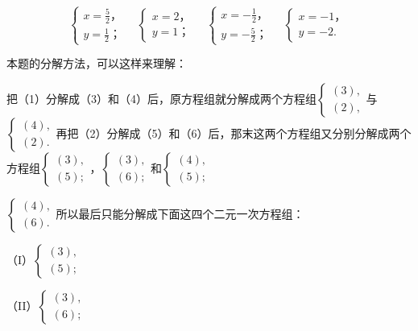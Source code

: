 \[
\left\{ \begin{array}{l} x = \frac{5}{2}\text{，} \\ y = \frac{1}{2}\text{；} \end{array} \right. \quad \left\{ \begin{array}{l} x = 2\text{，} \\ y = 1\text{；} \end{array} \right. \quad \left\{ \begin{array}{l} x = - \frac{1}{2}\text{，} \\ y = - \frac{5}{2}\text{；} \end{array} \right. \quad \left\{ \begin{array}{l} x = - 1\text{，} \\ y = - 2. \end{array} \right.
\]

 本题的分解方法，可以这样来理解：

把（1）分解成（3）和（4）后，原方程组就分解成两个方程组\(\left\{\begin{aligned}(3),\\ (2),\end{aligned}\right.\)与\(\left\{\begin{aligned}(4),\\ (2).\end{aligned}\right.\)再把（2）分解成（5）和（6）后，那末这两个方程组又分别分解成两个方程组\(\left\{\begin{aligned}(3),\\ (5);\end{aligned}\right.\)，\(\left\{\begin{aligned}(3),\\ (6);\end{aligned}\right.\)和\(\left\{\begin{aligned}(4),\\ (5);\end{aligned}\right.\)

\(\left\{\begin{aligned}(4),\\ (6).\end{aligned}\right.\)所以最后只能分解成下面这四个二元一次方程组：

（I）\(\left\{ \begin{array}{l} (3), \\ (5); \end{array} \right.\)

（II）\(\left\{ \begin{array}{l} (3), \\ (6); \end{array} \right.\)

